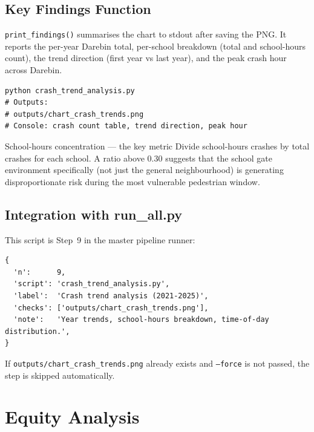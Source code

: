 \documentclass[11pt,a4paper,openany]{book}
\begin{document}
\section{Key Findings Function}

\texttt{print\_findings()} summarises the chart to stdout after saving the PNG.
It reports the per-year Darebin total, per-school breakdown (total and school-hours count),
the trend direction (first year vs last year), and the peak crash hour across Darebin.

\begin{lstlisting}[style=bash, caption={Running the crash trend analysis.}]
python crash_trend_analysis.py
# Outputs:
# outputs/chart_crash_trends.png
# Console: crash count table, trend direction, peak hour
\end{lstlisting}

\begin{tipbox}{School-hours concentration --- the key metric}
Divide school-hours crashes by total crashes for each school.
A ratio above 0.30 suggests that the school gate environment specifically
(not just the general neighbourhood) is generating disproportionate risk
during the most vulnerable pedestrian window.
\end{tipbox}

\section{Integration with run\_all.py}

This script is Step~9 in the master pipeline runner:

\begin{lstlisting}[style=text, caption={Step 9 in run\_all.py STEPS list.}]
{
  'n':      9,
  'script': 'crash_trend_analysis.py',
  'label':  'Crash trend analysis (2021-2025)',
  'checks': ['outputs/chart_crash_trends.png'],
  'note':   'Year trends, school-hours breakdown, time-of-day distribution.',
}
\end{lstlisting}

If \texttt{outputs/chart\_crash\_trends.png} already exists and \texttt{--force} is not
passed, the step is skipped automatically.

\chapter{Equity Analysis}
\end{document}
